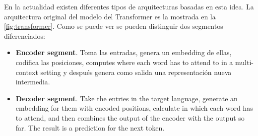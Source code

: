 En la actualidad existen diferentes tipos de arquitecturas basadas en esta
idea. La arquitectura original del modelo del Transformer es la mostrada en la
\vref{fig:transformer}. Como se puede ver se pueden distinguir dos segmentos
diferenciados:
\begin{itemize}
  \item \textbf{Encoder segment}. Toma las entradas, genera un embedding de
  ellas, codifica las posiciones, computes where each word has to attend to in
  a multi-context setting y después genera como salida una representación nueva
  intermedia.
  \item \textbf{Decoder segment}. Take the entries in the target language,
  generate an embedding for them with encoded positions, calculate in which
  each word has to attend, and then combines the output of the encoder with the
  output so far. The result is a prediction for the next token.
\end{itemize}
